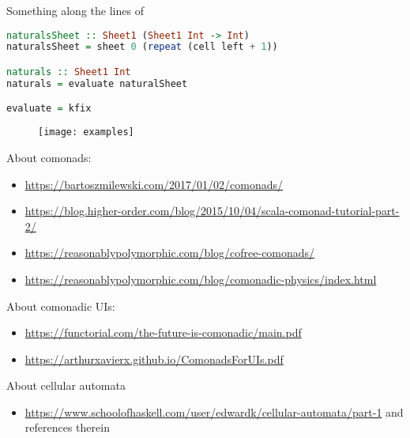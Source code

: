\documentclass[10pt]{beamer}
\begin{document}
\begin{frame}[fragile]
  Something along the lines of 
\begin{lstlisting}[language=haskell, basicstyle=\ttfamily]
naturalsSheet :: Sheet1 (Sheet1 Int -> Int) 
naturalsSheet = sheet 0 (repeat (cell left + 1))

naturals :: Sheet1 Int 
naturals = evaluate naturalSheet 

evaluate = kfix 
\end{lstlisting}
\end{frame}


\begin{frame}[fragile]
\begin{figure}
    \centering
    \texttt{[image: examples]}
  \end{figure}
\end{frame}


\begin{frame}[fragile]
  About comonads:
  \begin{itemize}
    \item \url{https://bartoszmilewski.com/2017/01/02/comonads/}
    \item \url{https://blog.higher-order.com/blog/2015/10/04/scala-comonad-tutorial-part-2/}
    \item \url{https://reasonablypolymorphic.com/blog/cofree-comonads/}
    \item \url{https://reasonablypolymorphic.com/blog/comonadic-physics/index.html}
  \end{itemize}
\end{frame}
\begin{frame}[fragile]
  About comonadic UIs:
  \begin{itemize}
    \item \url{https://functorial.com/the-future-is-comonadic/main.pdf}
    \item \url{https://arthurxavierx.github.io/ComonadsForUIs.pdf}
  \end{itemize}
  About cellular automata
  \begin{itemize}
    \item \url{https://www.schoolofhaskell.com/user/edwardk/cellular-automata/part-1} and references therein
  \end{itemize}
\end{frame}
\end{document}
